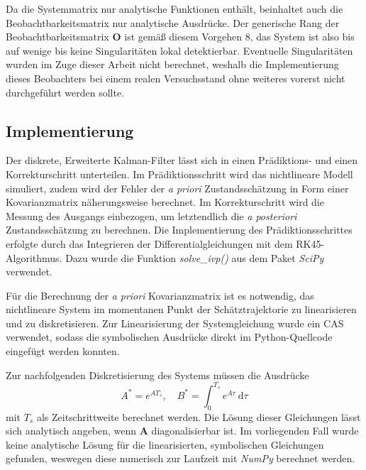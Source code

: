 \documentclass[10pt,twocolumn]{article}
\begin{document}
	Da die Systemmatrix nur analytische Funktionen enthält, beinhaltet auch die Beobachtbarkeitsmatrix nur analytische Ausdrücke. 
	Der generische Rang der Beobachtbarkeitsmatrix $\bm O$ ist gemäß diesem Vorgehen 8, das System ist also bis auf wenige bis keine Singularitäten lokal detektierbar.
	Eventuelle Singularitäten wurden im Zuge dieser Arbeit nicht berechnet, weshalb die Implementierung dieses Beobachters bei einem realen Versuchsstand ohne weiteres vorerst nicht durchgeführt werden sollte.
	
	\subsection{Implementierung}
	Der diskrete, Erweiterte Kalman-Filter lässt sich in einen Prädiktions- und einen Korrekturschritt unterteilen. 
	Im Prädiktionsschritt wird das nichtlineare Modell simuliert, zudem wird der Fehler der \textit{a priori} Zustandsschätzung in Form einer Kovarianzmatrix näherungsweise berechnet.
	Im Korrekturschritt wird die Messung des Ausgangs einbezogen, um letztendlich die \textit{a posteriori} Zustandsschätzung zu berechnen.
	Die Implementierung des Prädiktionsschrittes erfolgte durch das Integrieren der Differentialgleichungen mit dem RK45-Algorithmus.
	Dazu wurde die Funktion \textit{solve\_ivp()} aus dem Paket \textit{SciPy} verwendet.
	
	Für die Berechnung der \textit{a priori} Kovarianzmatrix ist es notwendig, das nichtlineare System im momentanen Punkt der Schätztrajektorie zu linearisieren und zu diskretisieren.
	Zur Linearisierung der Systemgleichung wurde ein CAS verwendet, sodass die symbolischen Ausdrücke direkt im Python-Quellcode eingefügt werden konnten.
	
	Zur nachfolgenden Diskretisierung des Systems müssen die Ausdrücke
	$$A^* = e^{A T_s},\quad B^* = \int_{0}^{T_s} e^{A \tau} \: \mathrm{d}\tau$$
	mit $T_s$ als Zeitschrittweite berechnet werden. 
	Die Lösung dieser Gleichungen lässt sich analytisch angeben, wenn $\bm A$	diagonalisierbar ist.
	Im vorliegenden Fall wurde keine analytische Lösung für die linearisierten, symbolischen Gleichungen gefunden, weswegen diese numerisch zur Laufzeit mit \textit{NumPy} berechnet werden.

	
\end{document}
